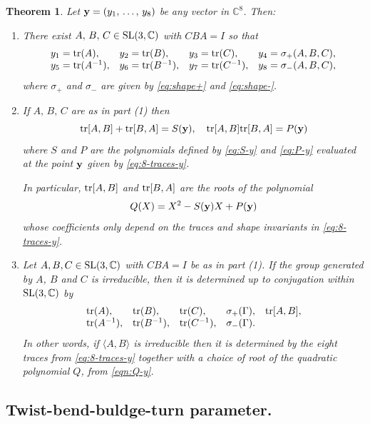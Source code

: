 \documentclass[11pt]{amsart}
\newtheorem{theorem}{Theorem}[section]
\numberwithin{equation}{section}
\begin{document}
\begin{theorem}\label{thm-lawton-new}
Let ${\bf y}=(y_1,\,\ldots,\, y_8)$ be any vector in ${\mathbb C}^8$. Then:
\begin{enumerate}
\item[(1)] 
There exist $A,\,B,\,C\in{\rm SL}(3,{\mathbb C})$ with $CBA=I$ so that
\begin{equation}\label{eq:8-traces-y}
	\begin{array}{llll} 
	y_1={\rm tr}(A),& y_2={\rm tr}(B),& y_3={\rm tr}(C),& y_4=\sigma_+(A,B,C), \\
	y_5={\rm tr}(A^{-1}), & y_6={\rm tr}(B^{-1}), & y_7={\rm tr}(C^{-1}), & y_8=\sigma_-(A,B,C),
    \end{array}
\end{equation}
where $\sigma_+$ and $\sigma_-$ are given by \eqref{eq:shape+} and \eqref{eq:shape-}.
\item[(2)] If $A,\,B,\,C$ are as in part (1) then 
$$
{\rm tr}[A,B]+{\rm tr}[B,A]=S({\bf y}),\quad {\rm tr}[A,B]{\rm tr}[B,A]=P({\bf y})
$$
where $S$ and $P$ are the polynomials defined by \eqref{eq:S-y} and \eqref{eq:P-y} evaluated
at the point ${\bf y}$ given by \eqref{eq:8-traces-y}. 

In particular, ${\rm tr}[A,B]$ and ${\rm tr}[B,A]$ are the roots of the polynomial
	\begin{equation}\label{eqn:Q-y}
		Q(X)=X^2-S({\bf y})X+P({\bf y})
	\end{equation}
whose coefficients only depend on the traces and shape invariants in \eqref{eq:8-traces-y}.
\item[(3)] Let $A,B,C \in {\rm SL}(3,\mathbb{C})$ with $CBA=I$ be as in part (1).
If the group generated by $A$, $B$ and $C$ is irreducible, 
then it is determined up to conjugation within ${\rm SL}(3,\mathbb{C})$ by
	$$
	\begin{array}{lllll} {\rm tr}(A),& {\rm tr}(B),& {\rm tr}(C),& \sigma_+(\Gamma), & {\rm tr}[A,B], \\
	{\rm tr}(A^{-1}), & {\rm tr}(B^{-1}), & {\rm tr}(C^{-1}), & \sigma_-(\Gamma).
    \end{array}
    $$
In other words, if $\langle A,B\rangle$ is irreducible then it is determined by the eight traces
from \eqref{eq:8-traces-y} together with a choice of root of the quadratic polynomial 
$Q$, from \eqref{eqn:Q-y}.
\end{enumerate}
\end{theorem}

\subsection{Twist-bend-buldge-turn parameter.}
\end{document}
